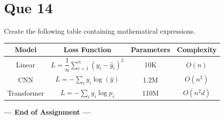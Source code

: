 \documentclass[12pt,a4paper]{article}
\begin{document}
	\section*{Que 14}
	
	Create the following table containing mathematical expressions.
	
	\begin{center}
		\renewcommand{\arraystretch}{1.7}
		\begin{tabular}{|c|c|c|c|}
			\hline
			\textbf{Model} &
			\textbf{Loss Function} &
			\textbf{Parameters} &
			\textbf{Complexity}\\
			\hline
			Linear &
			$L=\dfrac{1}{n}\sum_{i=1}^{n}(y_i-\hat{y}_i)^2$ &
			10K &
			$O(n)$\\
			\hline
			CNN &
			$L=-\sum_i y_i\log(\hat{y})$ &
			1.2M &
			$O(n^2)$\\
			\hline
			Transformer &
			$L=-\sum_i y_i\log p_i$ &
			110M &
			$O(n^2d)$\\
			\hline
		\end{tabular}
	\end{center}
	
	\vspace{1cm}
	
	\begin{center}
		\textbf{--- End of Assignment ---}
	\end{center}
	
\end{document}
